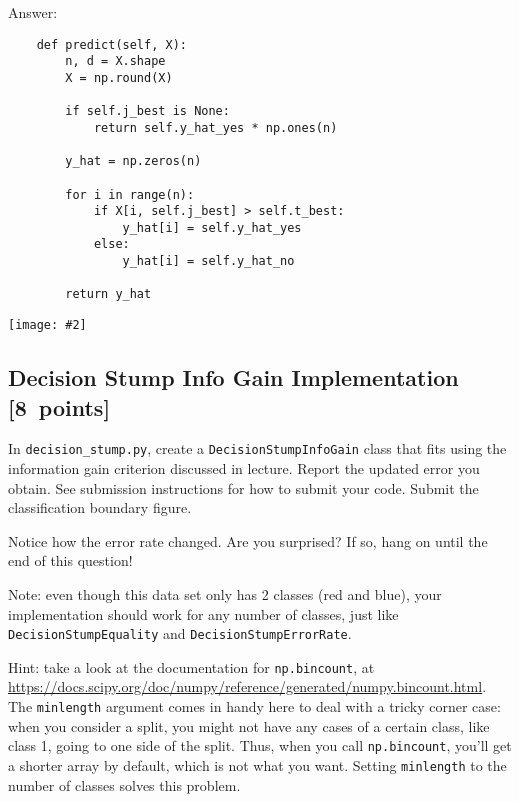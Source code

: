 \documentclass{article}
\newcommand{\blu}[1]{{\textcolor{blu}{#1}}}
\newenvironment{answer}{\par\begingroup\color{gre}Answer: }{\endgroup}
\let\ask\blu
\newcommand\pts[1]{\textcolor{pointscolour}{[#1~points]}}
\newcommand{\centerfig}[2]{\begin{center}\texttt{[image: \#2]}\end{center}}
\begin{document}
\begin{answer}
\begin{verbatim}
    def predict(self, X):
        n, d = X.shape
        X = np.round(X)

        if self.j_best is None:
            return self.y_hat_yes * np.ones(n)

        y_hat = np.zeros(n)

        for i in range(n):
            if X[i, self.j_best] > self.t_best:
                y_hat[i] = self.y_hat_yes
            else:
                y_hat[i] = self.y_hat_no

        return y_hat
  \end{verbatim}
  \centerfig{0.7}{./figs/DecisionStumpErrorRate_decisionBoundary}
  \end{answer}

  \subsection{Decision Stump Info Gain Implementation \pts{8}}

  In \texttt{decision\string_stump.py}, \ask{create a \texttt{DecisionStumpInfoGain} class that
  fits using the information gain criterion discussed in lecture.
  Report the updated error you obtain.
  See submission instructions for how to submit your code.
  Submit the classification boundary figure.}

  Notice how the error rate changed. Are you surprised? If so, hang on until the end of this question!

  Note: even though this data set only has 2 classes (red and blue), your implementation should work
  for any number of classes, just like \texttt{DecisionStumpEquality} and \texttt{DecisionStumpErrorRate}.

  Hint: take a look at the documentation for \texttt{np.bincount}, at \\
  \url{https://docs.scipy.org/doc/numpy/reference/generated/numpy.bincount.html}.
  The \texttt{minlength} argument comes in handy here to deal with a tricky corner case:
  when you consider a split, you might not have any cases of a certain class, like class 1,
  going to one side of the split. Thus, when you call \texttt{np.bincount}, you'll get
  a shorter array by default, which is not what you want. Setting \texttt{minlength} to the
  number of classes solves this problem.
\end{document}
